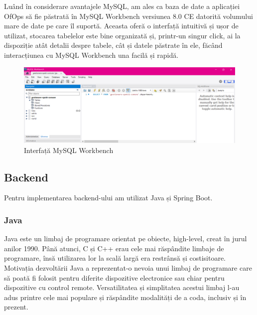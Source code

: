 Luând în considerare avantajele MySQL, am ales ca baza de date a aplicației OfOps să fie păstrată în MySQL Workbench versiunea 8.0 CE datorită volumului mare de date pe care îl suportă. Aceasta oferă o interfață intuitivă și ușor de utilizat, stocarea tabelelor este bine organizată și, printr-un singur click, ai la dispoziție atât detalii despre tabele, cât și datele păstrate în ele, făcând interacțiunea cu MySQL Workbench una facilă și rapidă.


\begin{figure}[!htb]
    \centering
    \includegraphics[width=0.9\linewidth]{images/interfata-mysql.png}
    \caption{Interfață MySQL Workbench}
    \label{fig:interfata-mysql}
\end{figure}


\subsection{Backend}
Pentru implementarea backend-ului am utilizat Java și Spring Boot. 

\begin{minipage}{\textwidth}
\hfill
\begin{minipage}{0.9\textwidth}
\subsubsection{Java}
\end{minipage}
\end{minipage}

\hspace{0cm} Java este un limbaj de programare orientat pe obiecte, high-level, creat în jurul anilor 1990. Până atunci, C și C++ erau cele mai răspândite limbaje de programare, însă utilizarea lor la scală largă era restrânsă și costisitoare. Motivația dezvoltării Java a reprezentat-o nevoia unui limbaj de programare care să poată fi folosit pentru diferite dispozitive electronice sau chiar pentru dispozitive cu control remote.\cite{citation3} Versatilitatea și simplitatea acestui limbaj l-au adus printre cele mai populare și răspândite modalități de a coda, inclusiv și în prezent. 

